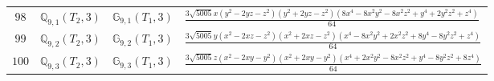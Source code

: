 \documentclass[fleqn,8pt,landscape]{jsarticle}
\begin{document}
\begin{table}[ht!]
\begin{center}
\begin{tabular}{cccl}
$ 98 $ & $ \mathbb{Q}_{9,1}(T_{2},3) $ & $ \mathbb{G}_{9,1}(T_{1},3) $ & $ \frac{3 \sqrt{5005} x \left(y^{2} - 2 y z - z^{2}\right) \left(y^{2} + 2 y z - z^{2}\right) \left(8 x^{4} - 8 x^{2} y^{2} - 8 x^{2} z^{2} + y^{4} + 2 y^{2} z^{2} + z^{4}\right)}{64} $ \\
$ 99 $ & $ \mathbb{Q}_{9,2}(T_{2},3) $ & $ \mathbb{G}_{9,2}(T_{1},3) $ & $ \frac{3 \sqrt{5005} y \left(x^{2} - 2 x z - z^{2}\right) \left(x^{2} + 2 x z - z^{2}\right) \left(x^{4} - 8 x^{2} y^{2} + 2 x^{2} z^{2} + 8 y^{4} - 8 y^{2} z^{2} + z^{4}\right)}{64} $ \\
$ 100 $ & $ \mathbb{Q}_{9,3}(T_{2},3) $ & $ \mathbb{G}_{9,3}(T_{1},3) $ & $ \frac{3 \sqrt{5005} z \left(x^{2} - 2 x y - y^{2}\right) \left(x^{2} + 2 x y - y^{2}\right) \left(x^{4} + 2 x^{2} y^{2} - 8 x^{2} z^{2} + y^{4} - 8 y^{2} z^{2} + 8 z^{4}\right)}{64} $ \\
 \hline \hline
\end{tabular}
\end{center}
\end{table}
\end{document}
